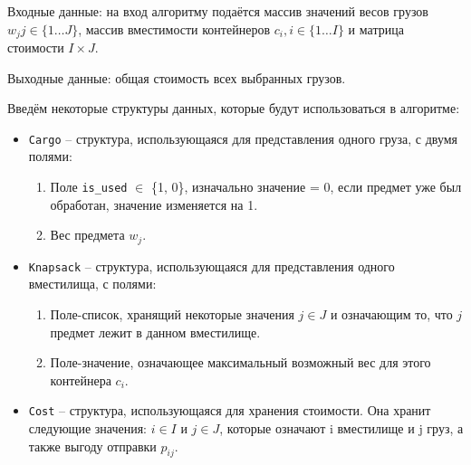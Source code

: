 \documentclass[14pt,a4paper]{extarticle}
\begin{document}
	Входные данные: на вход алгоритму подаётся массив значений весов грузов $w_j  j \in \{1\dots J\}$, массив вместимости контейнеров $c_i, i \in \{1\dots I\}$ и матрица стоимости $I \times J$.
	
	Выходные данные: общая стоимость всех выбранных грузов.
	
	Введём некоторые структуры данных, которые будут использоваться в алгоритме:
	\begin{itemize}
		\item \texttt{Cargo} -- структура, использующаяся для представления одного груза, с двумя полями: 
			\begin{enumerate}
				\item Поле \texttt{is\_used} $\in$ \{1, 0\}, изначально значение = 0, если предмет уже был обработан, значение изменяется на 1.
				\item Вес предмета $w_j$.
			\end{enumerate}
		\item \texttt{Knapsack} -- структура, использующаяся для представления одного вместилища, с полями:
			\begin{enumerate}
				\item Поле-список, хранящий некоторые значения $j \in J$ и означающим то, что $j$ предмет лежит в данном вместилище.
				\item Поле-значение, означающее максимальный возможный вес для этого контейнера $c_i$.
			\end{enumerate}
		\item \texttt{Cost} -- структура, использующаяся для хранения стоимости. Она хранит следующие значения: $i \in I$ и $j \in J$, которые означают i вместилище и j груз, а также выгоду отправки $p_{ij}$.
	\end{itemize}
	
\end{document}
